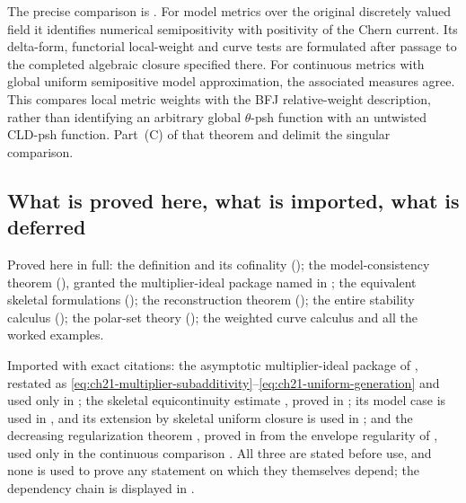 The precise comparison is .  For model
metrics over the original discretely valued field it identifies numerical
semipositivity with positivity of the Chern current.  Its delta-form,
functorial local-weight and curve tests are formulated after passage to the
completed algebraic closure specified there.  For continuous metrics with
global uniform semipositive model approximation, the associated measures
agree.  This compares local metric weights with the BFJ relative-weight
description, rather than identifying an arbitrary global $\theta$-psh
function with an untwisted CLD-psh function.  Part~(C) of that theorem and
 delimit the singular comparison.

\subsection{What is proved here, what is imported, what is deferred}
\label{sec:ch21-imported}

Proved here in full: the definition and its cofinality
(); the model-consistency theorem
(), granted the multiplier-ideal package
named in ; the equivalent skeletal
formulations (); the reconstruction theorem
(); the entire stability calculus
(); the polar-set theory
(); the weighted curve calculus and all the
worked examples.

Imported with exact citations: the asymptotic multiplier-ideal package of
\cite[Appendix~B]{BFJ16}, restated as
\eqref{eq:ch21-multiplier-subadditivity}--\eqref{eq:ch21-uniform-generation}
and used only in ; the skeletal
equicontinuity estimate , proved in
; its model case is used in
, and its extension by skeletal uniform closure
is used in ; and the decreasing regularization
theorem , proved in
 from the envelope regularity of
, used only in the continuous comparison
.  All three are stated before use, and none
is used to prove any statement on which they themselves depend; the
dependency chain is displayed in .

